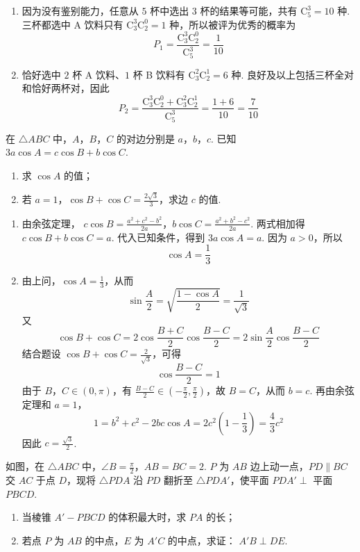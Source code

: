 \begin{solution}
\begin{enumerate}
\item 因为没有鉴别能力，任意从 \(5\) 杯中选出 \(3\) 杯的结果等可能，共有 \(\mathrm C_5^3=10\) 种. 三杯都选中 A 饮料只有 \(\mathrm C_3^3\mathrm C_2^0=1\) 种，所以被评为优秀的概率为
\[
P_1=\frac{\mathrm C_3^3\mathrm C_2^0}{\mathrm C_5^3}=\frac1{10}
\]
\item 恰好选中 \(2\) 杯 A 饮料、\(1\) 杯 B 饮料有 \(\mathrm C_3^2\mathrm C_2^1=6\) 种. 良好及以上包括三杯全对和恰好两杯对，因此
\[
P_2=\frac{\mathrm C_3^3\mathrm C_2^0+\mathrm C_3^2\mathrm C_2^1}{\mathrm C_5^3}
=\frac{1+6}{10}=\frac7{10}
\]
\end{enumerate}
\end{solution}

\begin{problem}
在 \(\triangle ABC\) 中，\(A\)，\(B\)，\(C\) 的对边分别是 \(a\)，\(b\)，\(c\). 已知 \(3a \cos A = c \cos B + b \cos C\).
\begin{enumerate}
\item 求 \( \cos A \) 的值；
\item 若 \(a = 1\)，\(\cos B + \cos C = \frac{2\sqrt{3}}{3}\)，求边 \(c\) 的值.
\end{enumerate}
\end{problem}

\begin{solution}
\begin{enumerate}
\item 由余弦定理，
\(c\cos B=\frac{a^2+c^2-b^2}{2a}\)，\(b\cos C=\frac{a^2+b^2-c^2}{2a}\).
两式相加得 \(c\cos B+b\cos C=a\). 代入已知条件，得到 \(3a\cos A=a\). 因为 \(a>0\)，所以
\[
\cos A=\frac13
\]
\item 由上问，\(\cos A=\frac13\)，从而
\[
\sin\frac A2=\sqrt{\frac{1-\cos A}{2}}=\frac1{\sqrt3}
\]
又
\[
\cos B+\cos C
=2\cos\frac{B+C}{2}\cos\frac{B-C}{2}
=2\sin\frac A2\cos\frac{B-C}{2}
\]
结合题设 \(\cos B+\cos C=\frac2{\sqrt3}\)，可得
\[
\cos\frac{B-C}{2}=1
\]
由于 \(B\)，\(C\in(0,\pi)\)，有 \(\frac{B-C}{2}\in(-\frac\pi2,\frac\pi2)\)，故 \(B=C\)，从而 \(b=c\). 再由余弦定理和 \(a=1\)，
\[
1=b^2+c^2-2bc\cos A
=2c^2\left(1-\frac13\right)=\frac43c^2
\]
因此 \(c=\frac{\sqrt3}{2}\).
\end{enumerate}
\end{solution}

\begin{problem}
如图，在 \(\triangle ABC\) 中，\(\angle B = \frac{\pi}{2}\)，\(AB = BC = 2\). \(P\) 为 \(AB\) 边上动一点，\(PD \parallel BC\) 交 \(AC\) 于点 \(D\)，现将 \(\triangle PDA\) 沿 \(PD\) 翻折至 \(\triangle PDA'\)，使平面 \(PDA' \perp\) 平面 \(PBCD\).
\begin{enumerate}
\item 当棱锥 \(A' - PBCD\) 的体积最大时，求 \(PA\) 的长；
\item 若点 \(P\) 为 \(AB\) 的中点，\(E\) 为 \(A'C\) 的中点，求证： \(A'B \perp DE\).
\end{enumerate}

\end{problem}

